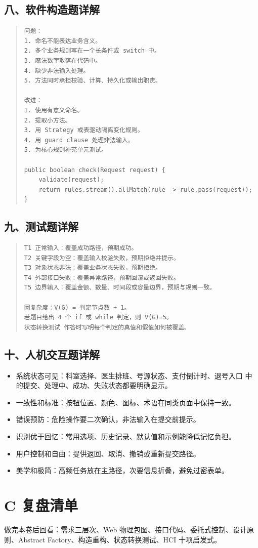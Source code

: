 \documentclass[UTF8,zihao=-4]{ctexart}
\begin{document}
\subsection{八、软件构造题详解}


\begin{quote}
\footnotesize
\begin{verbatim}
问题：
1. 命名不能表达业务含义。
2. 多个业务规则写在一个长条件或 switch 中。
3. 魔法数字散落在代码中。
4. 缺少非法输入处理。
5. 方法同时承担校验、计算、持久化或输出职责。

改进：
1. 使用有意义命名。
2. 提取小方法。
3. 用 Strategy 或表驱动隔离变化规则。
4. 用 guard clause 处理非法输入。
5. 为核心规则补充单元测试。

public boolean check(Request request) {
    validate(request);
    return rules.stream().allMatch(rule -> rule.pass(request));
}
\end{verbatim}
\end{quote}



\subsection{九、测试题详解}


\begin{quote}
\footnotesize
\begin{verbatim}
T1 正常输入：覆盖成功路径，预期成功。
T2 关键字段为空：覆盖输入校验失败，预期拒绝并提示。
T3 对象状态非法：覆盖业务状态失败，预期拒绝。
T4 外部接口失败：覆盖异常路径，预期回滚或返回失败。
T5 边界输入：覆盖金额、数量、时间段或容量边界，预期与规则一致。

圈复杂度：V(G) = 判定节点数 + 1。
若题目给出 4 个 if 或 while 判定，则 V(G)=5。
状态转换测试 作答时写明每个判定的真值和假值如何被覆盖。
\end{verbatim}
\end{quote}



\subsection{十、人机交互题详解}


\begin{itemize}
\item 系统状态可见：科室选择、医生排班、号源状态、支付倒计时、退号入口 中的提交、处理中、成功、失败状态都要明确显示。
\item 一致性和标准：按钮位置、颜色、图标、术语在同类页面中保持一致。
\item 错误预防：危险操作要二次确认，非法输入在提交前提示。
\item 识别优于回忆：常用选项、历史记录、默认值和示例能降低记忆负担。
\item 用户控制和自由：提供返回、取消、撤销或重新提交路径。
\item 美学和极简：高频任务放在主路径，次要信息折叠，避免过密表单。
\end{itemize}



\section{C 复盘清单}


做完本卷后回看：需求三层次、Web 物理包图、接口代码、委托式控制、设计原则、Abstract Factory、构造重构、状态转换测试、HCI 十项启发式。
\end{document}
